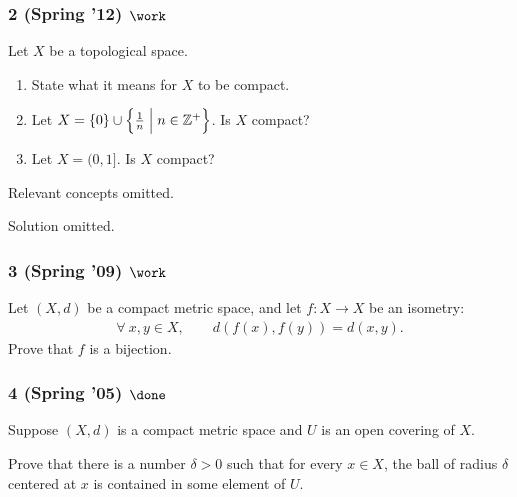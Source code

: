 \hypertarget{spring-12-work}{%
\subsubsection{\texorpdfstring{2 (Spring '12)
\(\work\)}{2 (Spring '12) \textbackslash work}}\label{spring-12-work}}

\begin{problem}[?]

Let \(X\) be a topological space.

\begin{enumerate}
\def\labelenumi{\alph{enumi}.}
\item
  State what it means for \(X\) to be compact.
\item
  Let
  \(X = \left\{{0}\right\} \cup \left\{{{1\over n} \mathrel{\Big|}n \in {\mathbb{Z}}^+ }\right\}\).
  Is \(X\) compact?
\item
  Let \(X = (0, 1]\). Is \(X\) compact?
\end{enumerate}

\end{problem}


Relevant concepts omitted.

Solution omitted.

\hypertarget{spring-09-work}{%
\subsubsection{\texorpdfstring{3 (Spring '09)
\(\work\)}{3 (Spring '09) \textbackslash work}}\label{spring-09-work}}

\begin{problem}[?]

Let \((X, d)\) be a compact metric space, and let \(f : X \to X\) be an
isometry:
\begin{align*}
\forall~ x, y \in X, \qquad d(f (x), f (y)) = d(x, y)
.\end{align*}
Prove that \(f\) is a bijection.

\end{problem}

\hypertarget{spring-05-done}{%
\subsubsection{\texorpdfstring{4 (Spring '05)
\(\done\)}{4 (Spring '05) \textbackslash done}}\label{spring-05-done}}

\begin{problem}[?]

Suppose \((X, d)\) is a compact metric space and \(U\) is an open
covering of \(X\).

Prove that there is a number \(\delta > 0\) such that for every
\(x \in X\), the ball of radius \(\delta\) centered at \(x\) is
contained in some element of \(U\).

\end{problem}

